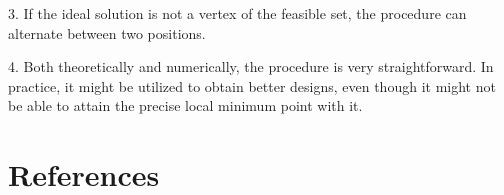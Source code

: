 3. If the ideal solution is not a vertex of the feasible set, the procedure can alternate between two positions.

4. Both theoretically and numerically, the procedure is very straightforward. In practice, it might be utilized to obtain better designs, even though it might not be able to attain the precise local minimum point with it.

\newpage

\chapter{References}
\label{References}

